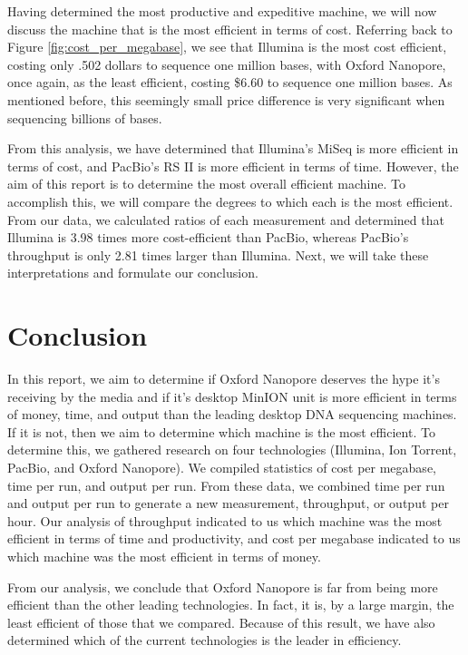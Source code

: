 \documentclass[12pt,letterpaper]{report}
\begin{document}
Having determined the most productive and expeditive machine, we will now discuss the machine that is the most efficient in terms of cost. Referring back to Figure \ref{fig:cost_per_megabase}, we see that Illumina is the most cost efficient, costing only .502 dollars to sequence one million bases, with Oxford Nanopore, once again, as the least efficient, costing \$6.60 to sequence one million bases. As mentioned before, this seemingly small price difference is very significant when sequencing billions of bases.

From this analysis, we have determined that Illumina's MiSeq is more efficient in terms of cost, and PacBio's RS II is more efficient in terms of time. However, the aim of this report is to determine the most overall efficient machine. To accomplish this, we will compare the degrees to which each is the most efficient. From our data, we calculated ratios of each measurement and determined that Illumina is 3.98 times more cost-efficient than PacBio, whereas PacBio's throughput is only 2.81 times larger than Illumina. Next, we will take these interpretations and formulate our conclusion. 

\section{Conclusion}

In this report, we aim to determine if Oxford Nanopore deserves the hype it's receiving by the media and if it's desktop MinION unit is more efficient in terms of money, time, and output than the leading desktop DNA sequencing machines. If it is not, then we aim to determine which machine is the most efficient. To determine this, we gathered research on four technologies (Illumina, Ion Torrent, PacBio, and Oxford Nanopore). We compiled statistics of cost per megabase, time per run, and output per run. From these data, we combined time per run and output per run to generate a new measurement, throughput, or output per hour. Our analysis of throughput indicated to us which machine was the most efficient in terms of time and productivity, and cost per megabase indicated to us which machine was the most efficient in terms of money.

From our analysis, we conclude that Oxford Nanopore is far from being more efficient than the other leading technologies. In fact, it is, by a large margin, the least efficient of those that we compared. Because of this result, we have also determined which of the current technologies is the leader in efficiency.
\end{document}
